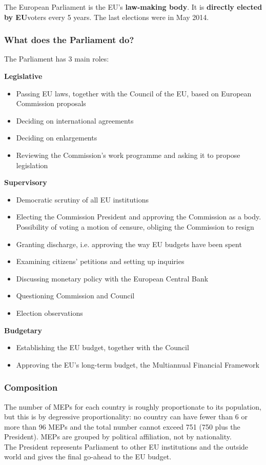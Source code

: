 The European Parliament is the EU's \textbf{law-making body}. It is \textbf{directly elected by EU}voters every 5 years. The last elections were in May 2014.
\nextline

\subsubsection{What does the Parliament do?}
The Parliament has 3 main roles:

	\textbf{Legislative}
	\begin{itemize}
		\item Passing EU laws, together with the Council of the EU, based on European Commission proposals
		\item Deciding on international agreements
		\item Deciding on enlargements
		\item Reviewing the Commission's work programme and asking it to propose legislation
	\end{itemize}

	\textbf{Supervisory}
	\begin{itemize}
		\item Democratic scrutiny of all EU institutions
		\item Electing the Commission President and approving the Commission as a body. Possibility of voting a motion of censure, obliging the Commission to resign
		\item Granting discharge, i.e. approving the way EU budgets have been spent
		\item Examining citizens' petitions and setting up inquiries
		\item Discussing monetary policy with the European Central Bank
		\item Questioning Commission and Council
		\item Election observations
	\end{itemize}

	\textbf{Budgetary}
	\begin{itemize}
		\item Establishing the EU budget, together with the Council
		\item Approving the EU's long-term budget, the Multiannual Financial Framework
	\end{itemize}

\subsubsection{Composition}
The number of MEPs for each country is roughly proportionate to its population, but this is by degressive proportionality: no country can have fewer than 6 or more than 96 MEPs and the total number cannot exceed 751 (750 plus the President). MEPs are grouped by political affiliation, not by nationality.
\\
The President represents Parliament to other EU institutions and the outside world and gives the final go-ahead to the EU budget.

